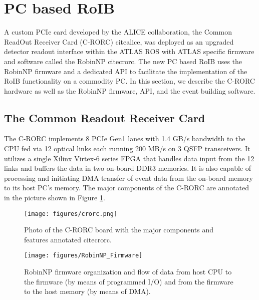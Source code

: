 \section{PC based RoIB}\label{sec:roib_new}

 A custom PCIe card developed by the ALICE collaboration, the Common ReadOut Receiver Card (C-RORC) cite{alice}, was deployed as an 
upgraded detector readout interface within the ATLAS ROS with ATLAS specific firmware and software called the RobinNP cite{crorc}. 
The new PC based RoIB uses the RobinNP firmware and a dedicated API to facilitate the implementation of the RoIB functionality 
on a commodity PC. In this section, we describe the C-RORC hardware as well as the RobinNP firmware, API, and the event building software. 
\subsection{The Common Readout Receiver Card}\label{sec:crorc}

The C-RORC implements 8 PCIe Gen1 lanes with 1.4 GB/s bandwidth to the CPU fed via 12 optical links each running 200 MB/s on 3 QSFP transceivers. It utilizes a single Xilinx Virtex-6 series FPGA that handles data input from the 12 links and buffers the data in two on-board DDR3 memories. It is also capable of processing and initiating DMA transfer of event data from the on-board memory to its host PC's memory. The major components of the C-RORC are annotated 
in the picture shown in Figure \ref{fig:crorc}.


\begin{figure}[tbp] %
\centering
\texttt{[image: figures/crorc.png]}
\caption{Photo of the C-RORC board with the major components and features annotated cite{crorc}.}
\label{fig:crorc}
\end{figure}

\begin{figure}[tbp] %
\centering
\texttt{[image: figures/RobinNP\_Firmware]}

\caption{RobinNP firmware organization
and  flow  of  data  from  host  CPU  to  the
firmware  (by  means  of  programmed  I/O)
and from the firmware to the host memory
(by means of DMA).}
\label{fig:robinnp_fw}
\end{figure}

